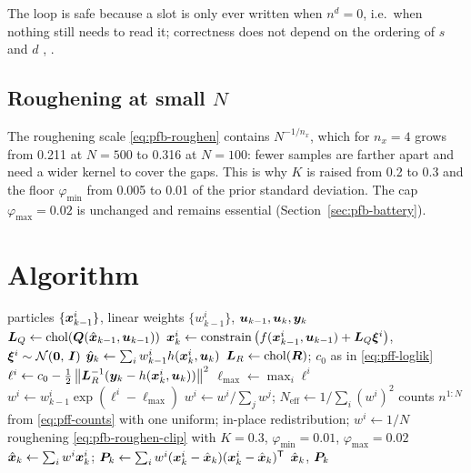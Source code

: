 \noindent The loop is safe because a slot is only ever written when $n^d = 0$, i.e.\ when nothing
still needs to read it; correctness does not depend on the ordering of $s$ and $d$
\cite[\S{}IV]{gustafsson2010pf}, \cite{hol2006resampling}.

\subsection{Roughening at small $N$}
The roughening scale \eqref{eq:pfb-roughen} contains $N^{-1/n_x}$, which for $n_x = 4$ grows from
\num{0.211} at $N=500$ to \num{0.316} at $N=100$: fewer samples are farther apart and need a wider
kernel to cover the gaps.  This is why $K$ is raised from \num{0.2} to \num{0.3} and the floor
$\varphi_{\min}$ from \num{0.005} to \num{0.01} of the prior standard deviation.  The cap
$\varphi_{\max} = 0.02$ is unchanged and remains essential
(Section~\ref{sec:pfb-battery}).

\section{Algorithm}
\begin{algorithm}[H]
\caption{PF-Fast --- one sampling period}
\begin{algorithmic}[1]
\Require particles $\{\bm{x}_{k-1}^i\}$, linear weights $\{w_{k-1}^i\}$, $\bm{u}_{k-1},\bm{u}_k,\bm{y}_k$
\State $\bm{L}_Q \gets \operatorname{chol}(\bm{Q}(\hat{\bm{x}}_{k-1},\bm{u}_{k-1}))$
 
  \State $\bm{x}_k^i \gets \operatorname{constrain}\big(f(\bm{x}_{k-1}^i,\bm{u}_{k-1}) + \bm{L}_Q\bm{\xi}^i\big)$, \; $\bm{\xi}^i\sim\mathcal{N}\!\left(\bm 0,\,\bm{I}\right)$
\EndFor
\State $\hat{\bm{y}}_k \gets \sum_i w_{k-1}^i h(\bm{x}_k^i,\bm{u}_k)$ 
\State $\bm{L}_R \gets \operatorname{chol}(\bm{R})$; \; $c_0$ as in \eqref{eq:pff-loglik}
 
  \State $\ell^i \gets c_0 - \tfrac12\left\lVert \bm{L}_R^{-1}(\bm{y}_k - h(\bm{x}_k^i,\bm{u}_k)) \right\rVert^2$
\EndFor
\State $\ell_{\max} \gets \max_i \ell^i$
 \State $w^i \gets w_{k-1}^i \exp(\ell^i - \ell_{\max})$  \EndFor
\State $w^i \gets w^i / \sum_j w^j$; \quad $N_{\mathrm{eff}} \gets 1/\sum_i (w^i)^2$
  \State counts $n^{1:N}$ from \eqref{eq:pff-counts} with one uniform; in-place redistribution; $w^i \gets 1/N$
  \State roughening \eqref{eq:pfb-roughen-clip} with $K = 0.3$, $\varphi_{\min}=0.01$, $\varphi_{\max}=0.02$
\EndIf
\State $\hat{\bm{x}}_k \gets \sum_i w^i \bm{x}_k^i$; \; $\bm{P}_k \gets \sum_i w^i(\bm{x}_k^i-\hat{\bm{x}}_k)(\bm{x}_k^i-\hat{\bm{x}}_k)^{\mathsf{T}}$
\Ensure $\hat{\bm{x}}_k$, $\bm{P}_k$
\end{algorithmic}
\end{algorithm}

